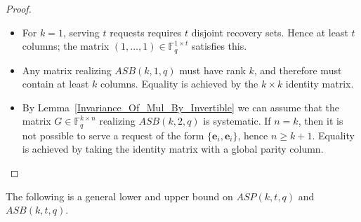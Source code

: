 \documentclass[11pt,a4paper]{article}
\theoremstyle{definition}
\newcommand{\bfe}{{\boldsymbol e}}
\newcommand{\F}{\mathbb{F}}
\begin{document}
\begin{proof}
    \text{ }
    \begin{itemize}

        \item[(i)] For $k=1$, serving $t$ requests requires $t$ disjoint recovery sets. Hence at least $t$ columns; the matrix $(1,\dots,1) \in \F_q^{1 \times t}$ satisfies this.
        
        \item[(ii)] Any matrix realizing $ASB(k,1,q)$ must have rank $k$, and therefore must contain at least $k$ columns.  
    Equality is achieved by the $k \times k$ identity matrix.
        
        \item[(iii)] By Lemma~\ref{Invariance_Of_Mul_By_Invertible} we can assume that the matrix $G\in \F_q^{k \times n}$ realizing $ASB(k,2,q)$ is systematic. If $n=k$, then it is not possible to serve a request of the form $\{\bfe_i,\bfe_i\}$, hence $n\geq k+1$. Equality is achieved by taking the identity matrix with a global parity column. \qedhere
    \end{itemize}
\end{proof}

The following is a general lower and upper bound on $ASP(k,t,q)$ and $ASB(k,t,q)$.
\end{document}
